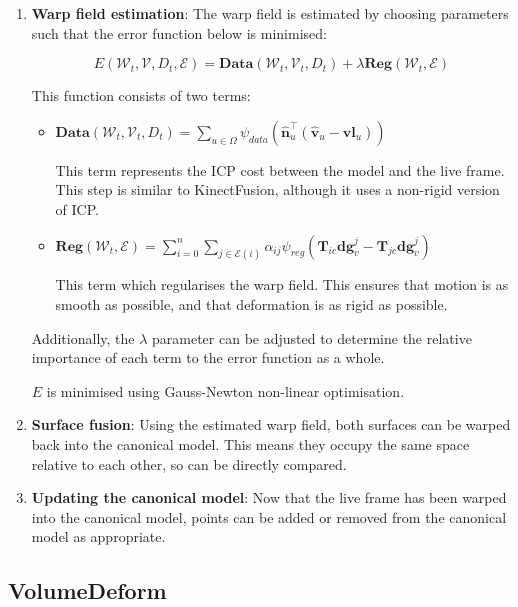 \documentclass[12pt,twoside]{report}
\begin{document}
\begin{enumerate}
\item \textbf{Warp field estimation}: The warp field is estimated by choosing parameters such that the error function below is minimised:

$$E(\mathcal{W}_t, \mathcal{V}, D_t, \mathcal{E}) = \textbf{Data}(\mathcal{W}_t, \mathcal{V}_t, D_t) + \lambda\textbf{Reg}(\mathcal{W}_t, \mathcal{E})$$

This function consists of two terms:
\begin{itemize}
\item $\textbf{Data}(\mathcal{W}_t, \mathcal{V}_t, D_t) = \sum\limits_{u \in \Omega} \psi_{data}(\hat{\textbf{n}}_u^\top (\hat{\textbf{v}}_u - \textbf{vl}_u))$

This term represents the ICP cost between the model and the live frame. This step is similar to KinectFusion, although it uses a non-rigid version of ICP.

\item $\textbf{Reg}(\mathcal{W}_t, \mathcal{E}) = \sum\limits_{i=0}^n\sum\limits_{j \in \mathcal{E}(i)}\alpha_{ij}\psi_{reg}(\textbf{T}_{ic}\textbf{dg}^j_v - \textbf{T}_{jc}\textbf{dg}^j_v)$

This term which regularises the warp field. This ensures that motion is as smooth as possible, and that deformation is as rigid as possible.
\end{itemize}

Additionally, the $\lambda$ parameter can be adjusted to determine the relative importance of each term to the error function as a whole.

$E$ is minimised using Gauss-Newton non-linear optimisation.

\item \textbf{Surface fusion}: Using the estimated warp field, both surfaces can be warped back into the canonical model. This means they occupy the same space relative to each other, so can be directly compared.

\item \textbf{Updating the canonical model}: Now that the live frame has been warped into the canonical model, points can be added or removed from the canonical model as appropriate.
\end{enumerate}


\subsection{VolumeDeform}
\end{document}
